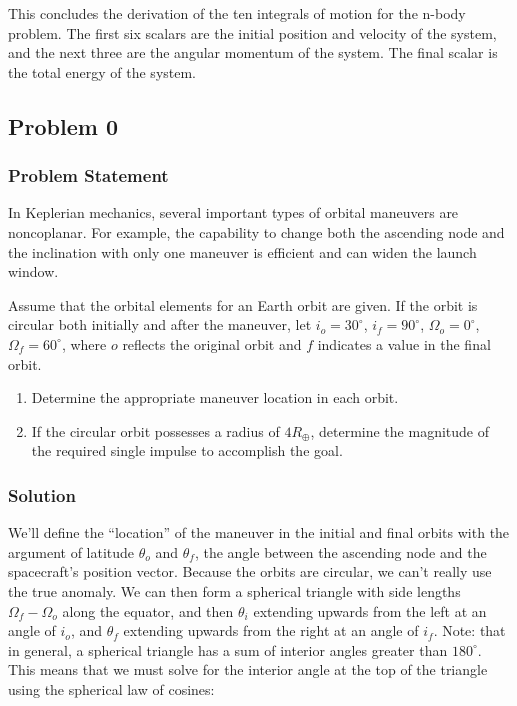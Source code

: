 \documentclass[
]{article}
\providecommand{\tightlist}{%
  \setlength{\itemsep}{0pt}\setlength{\parskip}{0pt}}
\begin{document}
This concludes the derivation of the ten integrals of motion for the
n-body problem. The first six scalars are the initial position and
velocity of the system, and the next three are the angular momentum of
the system. The final scalar is the total energy of the system.

\subsection{Problem 0}\label{problem-0}

\subsubsection{Problem Statement}\label{problem-statement-2}

In Keplerian mechanics, several important types of orbital maneuvers are
noncoplanar. For example, the capability to change both the ascending
node and the inclination with only one maneuver is efficient and can
widen the launch window.

Assume that the orbital elements for an Earth orbit are given. If the
orbit is circular both initially and after the maneuver, let
\(i_o=30^\circ\), \(i_f=90^\circ\), \(\Omega_o=0^\circ\),
\(\Omega_f=60^\circ\), where \(o\) reflects the original orbit and \(f\)
indicates a value in the final orbit.

\begin{enumerate}
\tightlist
\item
  Determine the appropriate maneuver location in each orbit.
\item
  If the circular orbit possesses a radius of \(4R_\oplus\), determine
  the magnitude of the required single impulse to accomplish the goal.
\end{enumerate}

\subsubsection{Solution}\label{solution-2}

We'll define the ``location'' of the maneuver in the initial and final
orbits with the argument of latitude \(\theta_o\) and \(\theta_f\), the
angle between the ascending node and the spacecraft's position vector.
Because the orbits are circular, we can't really use the true anomaly.
We can then form a spherical triangle with side lengths
\(\Omega_f - \Omega_o\) along the equator, and then \(\theta_i\)
extending upwards from the left at an angle of \(i_o\), and \(\theta_f\)
extending upwards from the right at an angle of \(i_f\). Note: that in
general, a spherical triangle has a sum of interior angles greater than
\(180^\circ\). This means that we must solve for the interior angle at
the top of the triangle using the spherical law of cosines:
\end{document}
